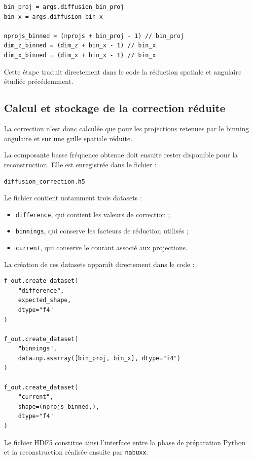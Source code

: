 \documentclass[11pt,a4paper]{report}
\begin{document}
\begin{verbatim}
bin_proj = args.diffusion_bin_proj
bin_x = args.diffusion_bin_x

nprojs_binned = (nprojs + bin_proj - 1) // bin_proj
dim_z_binned = (dim_z + bin_x - 1) // bin_x
dim_x_binned = (dim_x + bin_x - 1) // bin_x
\end{verbatim}

Cette étape traduit directement dans le code la réduction spatiale et
angulaire étudiée précédemment.

\subsection{Calcul et stockage de la correction réduite}

La correction n'est donc calculée que pour les projections retenues par le
binning angulaire et sur une grille spatiale réduite.

La composante basse fréquence obtenue doit ensuite rester disponible pour
la reconstruction. Elle est enregistrée dans le fichier :

\begin{center}
\texttt{diffusion\_correction.h5}
\end{center}

Le fichier contient notamment trois datasets :

\begin{itemize}
    \item \texttt{difference}, qui contient les valeurs de correction ;
    \item \texttt{binnings}, qui conserve les facteurs de réduction
    utilisés ;
    \item \texttt{current}, qui conserve le courant associé aux projections.
\end{itemize}

La création de ces datasets apparaît directement dans le code :

\begin{verbatim}
f_out.create_dataset(
    "difference",
    expected_shape,
    dtype="f4"
)

f_out.create_dataset(
    "binnings",
    data=np.asarray([bin_proj, bin_x], dtype="i4")
)

f_out.create_dataset(
    "current",
    shape=(nprojs_binned,),
    dtype="f4"
)
\end{verbatim}

Le fichier HDF5 constitue ainsi l'interface entre la phase de préparation
Python et la reconstruction réalisée ensuite par \texttt{nabuxx}.
\end{document}
